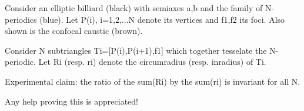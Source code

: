Consider an elliptic billiard (black) with semiaxes a,b and the family of N-periodics (blue). Let P(i), i=1,2,...N denote its vertices and f1,f2 its foci.  Also shown is the confocal caustic (brown).

Consider N subtriangles Ti=[P(i),P(i+1),f1] which together tesselate the N-periodic. Let Ri (resp. ri) denote the circumradius (resp. inradius) of Ti.

Experimental claim: the ratio of the sum(Ri) by the sum(ri) is invariant for all N.

Any help proving this is appreciated!